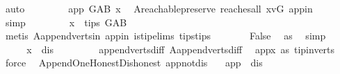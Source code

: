 \begin{isabellebody}
\ auto\ \isanewline
\ \ \ \ \isamarkupfalse%
\ \isamarkupfalse%
\ {\isachardoublequoteopen}app\ {\isasymrightarrow}\isactrlsup {\isacharplus}{\kern0pt}\isactrlbsub G{\isacharunderscore}{\kern0pt}AB\isactrlesub \ x{\isachardoublequoteclose}\ \isamarkupfalse%
\ A{}{\isachardot}{\kern0pt}reachable{}{\isacharunderscore}{\kern0pt}preserve\ reaches{\isacharunderscore}{\kern0pt}all\ x{\isacharunderscore}{\kern0pt}vG\ app{\isacharunderscore}{\kern0pt}in\isanewline
\ \ \ \ \ \ \isamarkupfalse%
\ simp\ \isanewline
\ \ \ \ \isamarkupfalse%
\ \isamarkupfalse%
\ {\isachardoublequoteopen}x\ {\isasymnotin}\ tips\ G{\isacharunderscore}{\kern0pt}AB{\isachardoublequoteclose}\isanewline
\ \ \ \ \ \ \isamarkupfalse%
\ {\isacharparenleft}{\kern0pt}metis\ A{}{\isachardot}{\kern0pt}append{\isacharunderscore}{\kern0pt}verts{\isacharunderscore}{\kern0pt}in\ app{\isacharunderscore}{\kern0pt}in\ is{\isacharunderscore}{\kern0pt}tip{\isachardot}{\kern0pt}elims{\isacharparenleft}{\kern0pt}{}{\isacharparenright}{\kern0pt}\ tips{\isacharunderscore}{\kern0pt}tips{\isacharparenright}{\kern0pt}\isanewline
\ \ \ \ \isamarkupfalse%
\ \isamarkupfalse%
\ False\ \isamarkupfalse%
\ as{}\ \isamarkupfalse%
\ simp\isanewline
\ \ \isamarkupfalse%
\isanewline
\ \ \isamarkupfalse%
\ \isamarkupfalse%
\ {\isachardoublequoteopen}x\ {\isacharequal}{\kern0pt}\ dis{\isachardoublequoteclose}\ \isamarkupfalse%
\ \isanewline
\ \ \ \ \ \ append{\isacharunderscore}{\kern0pt}verts{\isacharunderscore}{\kern0pt}diff\ A{}{\isachardot}{\kern0pt}append{\isacharunderscore}{\kern0pt}verts{\isacharunderscore}{\kern0pt}diff\ \isamarkupfalse%
\ app{\isacharunderscore}{\kern0pt}x\ as{}\ tip{\isacharunderscore}{\kern0pt}in{\isacharunderscore}{\kern0pt}verts\ \isamarkupfalse%
\ force\isanewline
{}\isamarkupfalse%
%
\endisatagproof
{\isafoldproof}%
%
\isadelimproof
\isanewline
%
\endisadelimproof
\isanewline
{}\isamarkupfalse%
\ {\isacharparenleft}{\kern0pt}\ Append{\isacharunderscore}{\kern0pt}One{\isacharunderscore}{\kern0pt}Honest{\isacharunderscore}{\kern0pt}Dishonest{\isacharparenright}{\kern0pt}\ app{\isacharunderscore}{\kern0pt}not{\isacharunderscore}{\kern0pt}dis{\isacharcolon}{\kern0pt}\ \isanewline
\ \ {\isachardoublequoteopen}app\ {\isasymnoteq}\ dis{\isachardoublequoteclose}\isanewline

\end{isabellebody}
